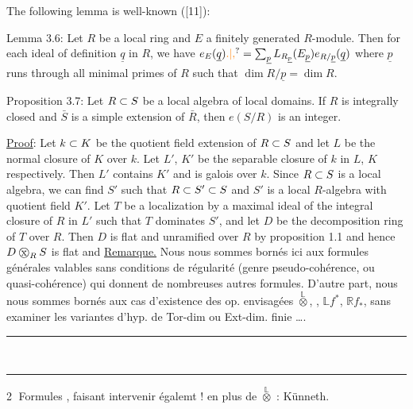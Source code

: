 The following lemma is well-known ([11]):

Lemma 3.6: Let $R$ be a local ring and $E$ a finitely generated $R$-module.
Then for each ideal of definition $\underline q$ in $R$, we have $e_E(\underline q)\unsure{.|,}=
\handwritten{\sum}_{\underline p} L_{R_{\underline p}}(E_{\underline p})e_{R/\underline p}(\underline q)$
where $\underline p$ runs through all minimal primes of $R$ such that $\dim R/\underline p=\dim R$.

Proposition 3.7: Let $R\subset S$ be a local algebra of local domains. If
$R$ is integrally closed and $\bar S$ is a simple extension of $\bar R$, then $e(S/R)$ is
an integer.

\uline{Proof}: Let $k\subset K$ be the quotient field extension of $R\subset S$ and let $L$
be the normal closure of $K$ over $k$. Let $L'$, $K'$ be the separable closure
of $k$ in $L$, $K$ respectively. Then $L'$ contains $K'$ and is galois over $k$.
Since $R\subset S$ is a local algebra, we can find $S'$ such that $R\subset S'\subset S$ and $S'$
is a local $R$-algebra with quotient field $K'$. Let $T$ be a localization by a
maximal ideal of the integral closure of $R$ in $L'$ such that $T$ dominates $S'$,
and let $D$ be the decomposition ring of $T$ over $R$. Then $D$ is flat and
unramified over $R$ by proposition 1.1 and hence $D\mathbin{\ooalign{\hfil$\mathrm{x}$\hfil\cr\hfil$\handwritten{\bigcirc}$\hfil\cr}}_R S$ is flat and
\uline{Remarque.} Nous nous sommes bornés ici aux formules générales valables sans conditions de régularité (genre pseudo-cohérence, ou quasi-cohérence) qui donnent de nombreuses autres formules. D'autre part, nous nous sommes bornés aux cas d'existence  des op. envisagées $\overset{\mathbb L}{\otimes}$, , $\mathbb L f^*$, $\mathbb R f_*$, sans examiner les variantes  d'hyp. de Tor-dim ou Ext-dim. finie \ldots.

\begin{center}\rule{0.95cm}{0.4pt}\\[-0.75em]\rule{0.72cm}{0.4pt}\end{center}

\textcircled{2} Formules , faisant intervenir égalemt $!$ en plus de $\overset{\mathbb L}{\otimes}$ : Künneth.

